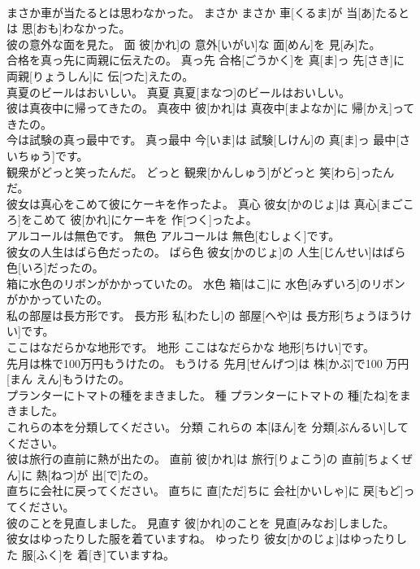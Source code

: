 \documentclass[8pt]{extreport}
\begin{document}
\begin{CJK}{UTF8}{min}
\\	まさか車が当たるとは思わなかった。	まさか	まさか 車[くるま]が 当[あ]たるとは 思[おも]わなかった。	
\\	彼の意外な面を見た。	面	彼[かれ]の 意外[いがい]な 面[めん]を 見[み]た。	
\\	合格を真っ先に両親に伝えたの。	真っ先	合格[ごうかく]を 真[ま]っ 先[さき]に 両親[りょうしん]に 伝[つた]えたの。	
\\	真夏のビールはおいしい。	真夏	真夏[まなつ]のビールはおいしい。	
\\	彼は真夜中に帰ってきたの。	真夜中	彼[かれ]は 真夜中[まよなか]に 帰[かえ]ってきたの。	
\\	今は試験の真っ最中です。	真っ最中	今[いま]は 試験[しけん]の 真[ま]っ 最中[さいちゅう]です。	
\\	観衆がどっと笑ったんだ。	どっと	観衆[かんしゅう]がどっと 笑[わら]ったんだ。	
\\	彼女は真心をこめて彼にケーキを作ったよ。	真心	彼女[かのじょ]は 真心[まごころ]をこめて 彼[かれ]にケーキを 作[つく]ったよ。	
\\	アルコールは無色です。	無色	アルコールは 無色[むしょく]です。	
\\	彼女の人生はばら色だったの。	ばら色	彼女[かのじょ]の 人生[じんせい]はばら 色[いろ]だったの。	
\\	箱に水色のリボンがかかっていたの。	水色	箱[はこ]に 水色[みずいろ]のリボンがかかっていたの。	
\\	私の部屋は長方形です。	長方形	私[わたし]の 部屋[へや]は 長方形[ちょうほうけい]です。	
\\	ここはなだらかな地形です。	地形	ここはなだらかな 地形[ちけい]です。	
\\	先月は株で100万円もうけたの。	もうける	先月[せんげつ]は 株[かぶ]で100 万円[まん えん]もうけたの。	
\\	プランターにトマトの種をまきました。	種	プランターにトマトの 種[たね]をまきました。	
\\	これらの本を分類してください。	分類	これらの 本[ほん]を 分類[ぶんるい]してください。	
\\	彼は旅行の直前に熱が出たの。	直前	彼[かれ]は 旅行[りょこう]の 直前[ちょくぜん]に 熱[ねつ]が 出[で]たの。	
\\	直ちに会社に戻ってください。	直ちに	直[ただ]ちに 会社[かいしゃ]に 戻[もど]ってください。	
\\	彼のことを見直しました。	見直す	彼[かれ]のことを 見直[みなお]しました。	
\\	彼女はゆったりした服を着ていますね。	ゆったり	彼女[かのじょ]はゆったりした 服[ふく]を 着[き]ていますね。	

\end{CJK}
\end{document}
